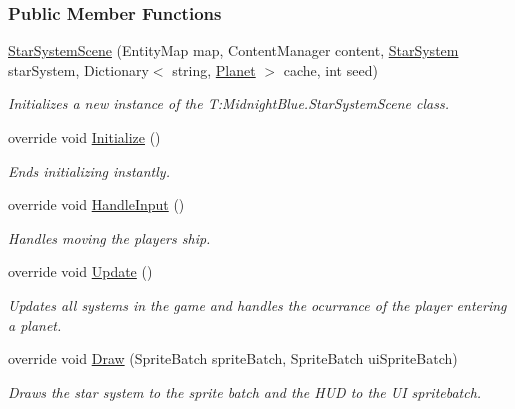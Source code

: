 \subsubsection*{Public Member Functions}
\begin{DoxyCompactItemize}
\item 
\hyperlink{class_midnight_blue_1_1_star_system_scene_a630b2de039b719d35fbdf572bbc69ea0}{Star\+System\+Scene} (Entity\+Map map, Content\+Manager content, \hyperlink{class_midnight_blue_1_1_star_system}{Star\+System} star\+System, Dictionary$<$ string, \hyperlink{class_midnight_blue_1_1_planet}{Planet} $>$ cache, int seed)
\begin{DoxyCompactList}\small\item\em Initializes a new instance of the T\+:\+Midnight\+Blue.\+Star\+System\+Scene class. \end{DoxyCompactList}\item 
override void \hyperlink{class_midnight_blue_1_1_star_system_scene_a1b593cd45d0f1b6c02f17ec5dd1033ca}{Initialize} ()
\begin{DoxyCompactList}\small\item\em Ends initializing instantly. \end{DoxyCompactList}\item 
override void \hyperlink{class_midnight_blue_1_1_star_system_scene_a9fd64901322082a4da8658650257163d}{Handle\+Input} ()
\begin{DoxyCompactList}\small\item\em Handles moving the players ship. \end{DoxyCompactList}\item 
override void \hyperlink{class_midnight_blue_1_1_star_system_scene_ac36506b721064e015a9f93140681d93a}{Update} ()
\begin{DoxyCompactList}\small\item\em Updates all systems in the game and handles the ocurrance of the player entering a planet. \end{DoxyCompactList}\item 
override void \hyperlink{class_midnight_blue_1_1_star_system_scene_ac3d90fb8d914d15b912f5da3cc1aa8a0}{Draw} (Sprite\+Batch sprite\+Batch, Sprite\+Batch ui\+Sprite\+Batch)
\begin{DoxyCompactList}\small\item\em Draws the star system to the sprite batch and the H\+UD to the UI spritebatch. \end{DoxyCompactList}\item 

\end{DoxyCompactItemize}
